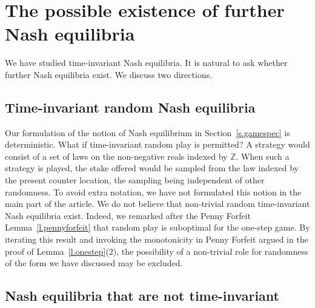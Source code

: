 \documentclass[letterpaper,11pt,oneside,reqno]{amsbook}
\newcommand{\Z}{\ensuremath{\mathbb{Z}}}
\numberwithin{figure}{chapter}
\theoremstyle{definition}
\theoremstyle{definition}
\theoremstyle{definition}
\theoremstyle{definition}
\theoremstyle{definition}
\begin{document}
 


\section{The possible existence of further Nash equilibria}

We have studied time-invariant Nash equilibria. It is natural to ask whether further Nash equilibria exist. We discuss two directions.

\subsection{Time-invariant random Nash equilibria}

Our formulation of the notion of Nash equilibrium in Section~\ref{s.gamespec} is deterministic. What if time-invariant random play is permitted? A strategy would consist of a set of laws on the non-negative reals indexed by $\Z$. When such a strategy is played, the stake offered would be sampled from the law indexed by the present counter location, the sampling being independent of other randomness. 
To avoid extra notation, we have not formulated this notion in the main part of the article. We do not believe that non-trivial random time-invariant Nash equilibria exist. Indeed, we remarked after the Penny Forfeit Lemma~\ref{l.pennyforfeit} that random play is suboptimal for the one-step game. By iterating this result and invoking the monotonicity 
in Penny Forfeit argued in the proof of Lemma~\ref{l.onestep}(2),
 the possibility of a non-trivial role for randomness of the form we have discussed may be excluded.

\subsection{Nash equilibria that are not time-invariant}
\end{document}
